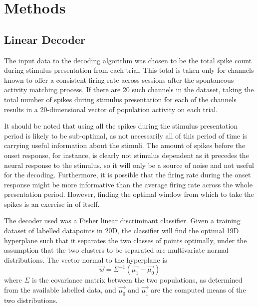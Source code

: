 \section{Methods}

\subsection{Linear Decoder}
\label{sec:dec-meth-lin}

The input data to the decoding algorithm was chosen to be the total spike count during stimulus presentation from each trial. This total is taken only for channels known to offer a consistent firing rate across sessions after the spontaneous activity matching process. If there are 20 such channels in the dataset, taking the total number of spikes during stimulus presentation for each of the channels results in a 20-dimensional vector of population activity on each trial.

It should be noted that using all the spikes during the stimulus presentation period is likely to be sub-optimal, as not necessarily all of this period of time is carrying useful information about the stimuli. The amount of spikes before the onset response, for instance, is clearly not stimulus dependent as it precedes the neural response to the stimulus, so it will only be a source of noise and  not useful for the decoding.
Furthermore, it is possible that the firing rate during the onset response might be more informative than the average firing rate across the whole presentation period. However, finding the optimal window from which to take the spikes is an exercise in of itself.

The decoder used was a Fisher linear discriminant classifier. Given a training dataset of labelled datapoints in 20D, the classifier will find the optimal 19D hyperplane such that it separates the two classes of points optimally, under the assumption that the two clusters to be separated are multivariate normal distributions. The vector normal to the hyperplane is 
\begin{equation}
\vec{w} = \Sigma^{-1}\left(\vec{\mu_1}-\vec{\mu_0}\right)
\end{equation}
where $\Sigma$ is the covariance matrix between the two populations, as determined from the available labelled data, and $\vec{\mu_0}$ and $\vec{\mu_1}$ are the computed means of the two distributions.

